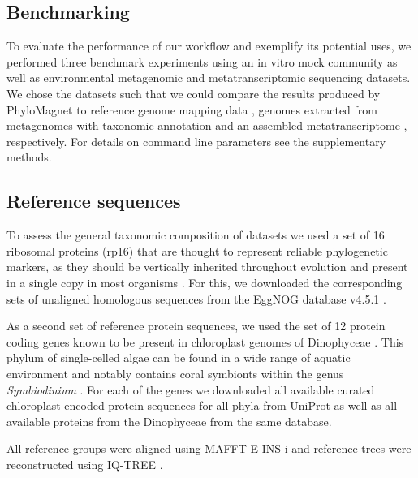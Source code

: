 \documentclass{bioinfo}
\begin{document}
\begin{methods}
\section{Benchmarking}
To evaluate the performance of our workflow and exemplify its potential uses, we performed three benchmark experiments using an in vitro mock community as well as environmental metagenomic and metatranscriptomic sequencing datasets. We chose the datasets such that we could compare the results produced by PhyloMagnet to reference genome mapping data \citep{Singer2016}, genomes extracted from metagenomes with taxonomic annotation \citep{Delmont2018} and an assembled metatranscriptome \citep{Frazier2017}, respectively. For details on command line parameters see the supplementary methods.

\subsection{Reference sequences}
To assess the general taxonomic composition of datasets we used a set of 16 ribosomal proteins (rp16) that are thought to represent reliable phylogenetic markers, as they should be vertically inherited throughout evolution and present in a single copy in most organisms \citep{Brown2015}. For this, we downloaded the corresponding sets of unaligned homologous sequences from the EggNOG database v4.5.1 \citep[][see Table \ref{X}]{Huerta-cepas2016b}.

As a second set of reference protein sequences, we used the set of 12 protein coding genes known to be present in chloroplast genomes of Dinophyceae \citep{Howe2008}. This phylum of single-celled algae can be found in a wide range of aquatic environment and notably contains coral symbionts within the genus \textit{Symbiodinium} \citep{Gomez2012}. For each of the genes we downloaded all available curated chloroplast encoded protein sequences for all phyla from UniProt \citep{Apweiler2004} as well as all available proteins from the Dinophyceae from the same database.

All reference groups were aligned using MAFFT E-INS-i \citep{Katoh2013} and reference trees were reconstructed using IQ-TREE \citep[under the LG+G+F model;][]{Nguyen2015}.


\end{methods}
\end{document}
